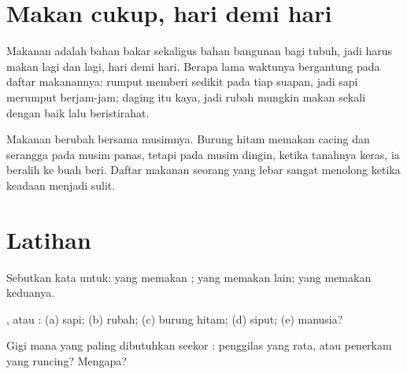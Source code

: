 \section{Makan cukup, hari demi hari}

\begin{proposition}\label{prop:g2:what-animals-eat:daily}
Makanan adalah bahan bakar sekaligus bahan bangunan bagi tubuh, jadi
 harus makan lagi dan lagi, hari demi hari. Berapa lama waktunya
bergantung pada daftar makanannya: rumput memberi sedikit pada tiap
suapan, jadi sapi merumput berjam-jam; daging itu kaya, jadi rubah
mungkin makan sekali dengan baik lalu beristirahat.
\end{proposition}
\admitted

\begin{example}\label{ex:g2:what-animals-eat:winter}
Makanan berubah bersama musimnya. Burung hitam memakan cacing dan
serangga pada musim panas, tetapi pada musim dingin, ketika tanahnya
keras, ia beralih ke buah beri. Daftar makanan seorang  yang
lebar sangat menolong ketika keadaan menjadi sulit.
\end{example}

\section{Latihan}

\begin{exercise}[$\star$]\label{exo:g2:what-animals-eat:1}
Sebutkan kata untuk:  yang memakan ;  yang memakan
 lain;  yang memakan keduanya.
\end{exercise}

\begin{exercise}[$\star$]\label{exo:g2:what-animals-eat:2}
,  atau : (a) sapi; (b) rubah; (c) burung
hitam; (d) siput; (e) manusia?
\end{exercise}

\begin{exercise}[$\star$]\label{exo:g2:what-animals-eat:3}
Gigi mana yang paling dibutuhkan seekor : penggilas yang
rata, atau penerkam yang runcing? Mengapa?
\end{exercise}

